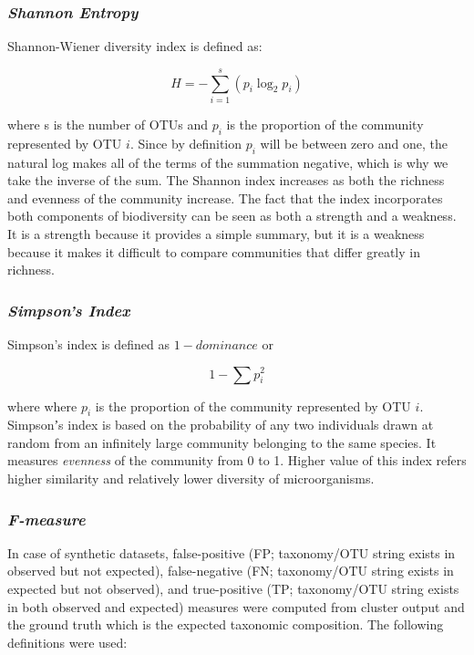 \documentclass[10pt, conference, compsocconf]{IEEEtran}
\begin{document}
\subsubsection{\textit{Shannon Entropy}}

Shannon-Wiener diversity index is defined as:

\begin{equation}
H={-} \sum_{i=1}^{s} \left( p_i\log_2p_i \right)
\end{equation}

where s is the number of OTUs and $p_i$ is the proportion of the community represented by OTU $i$. Since by definition $p_i$ will be between zero and one, the natural log makes all of the terms of the summation negative, which is why we take the inverse of the sum. The Shannon index increases as both the richness and evenness of the community increase. The fact that the index incorporates both components of biodiversity can be seen as both a strength and a weakness. It is a strength because it provides a simple summary, but it is a weakness because it makes it difficult to compare communities that differ greatly in richness.


\subsubsection{\textit{Simpson's Index}}
Simpson’s index is defined as ${1-dominance}$ or

\begin{equation}
1 - \sum p_i^2
\end{equation}

where where $p_i$ is the proportion of the community represented by OTU $i$. Simpsonʼs index is based on the probability of any two individuals drawn at random from an infinitely large community belonging to the same species. It measures \textit{evenness} of the community from 0 to 1. Higher value of this index refers higher similarity and relatively lower diversity of microorganisms.


\subsubsection{\textit{F-measure}}
In case of synthetic datasets, false-positive (FP; taxonomy/OTU string 
exists in observed but not expected), false-negative
(FN; taxonomy/OTU string exists in expected but not observed), and 
true-positive (TP; taxonomy/OTU string exists in both observed and expected) measures were computed from 
cluster output and the ground truth which is the expected taxonomic composition. The following definitions were used:
\end{document}
